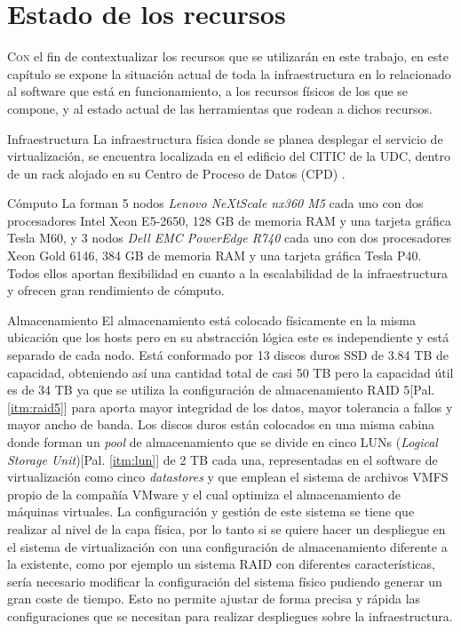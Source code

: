 \chapter{Estado de los recursos}
\label{chap:estadoInfraestructuraSistema}

\lettrine{C}{on} el fin de contextualizar los recursos que se utilizarán en este trabajo, en este capítulo se expone la situación actual de toda la infraestructura en lo relacionado al software que está en funcionamiento, a los recursos físicos de los que se compone, y al estado actual de las herramientas que rodean a dichos recursos.

\begin{section}{Infraestructura}
La infraestructura física donde se planea desplegar el servicio de virtualización, se encuentra localizada en el edificio del CITIC de la UDC, dentro de un rack alojado en su Centro de Proceso de Datos (CPD) \cite{citicUDC}. 
\begin{subsection}{Cómputo}
    La forman 5 nodos \textit{Lenovo NeXtScale nx360 M5} cada uno con dos procesadores Intel Xeon E5-2650, 128 GB de memoria RAM y una tarjeta gráfica Tesla M60,  y 3 nodos \textit{Dell EMC PowerEdge R740} cada uno con dos procesadores Xeon Gold 6146, 384 GB de memoria RAM y una tarjeta gráfica Tesla P40. Todos ellos aportan flexibilidad en cuanto a la escalabilidad de la infraestructura y ofrecen gran rendimiento de cómputo.
\end{subsection}
\begin{subsection}{Almacenamiento}
    El almacenamiento está colocado físicamente en la misma ubicación que los hosts pero en su abstracción lógica este es independiente y está separado de cada nodo. Está conformado por 13 discos duros SSD de 3.84 TB de capacidad, obteniendo así una cantidad total de casi 50 TB pero la capacidad útil es de 34 TB ya que se utiliza la configuración de almacenamiento RAID 5[Pal. \ref{itm:raid5}] para aporta mayor  integridad de los datos, mayor tolerancia a fallos y mayor ancho de banda. Los discos duros están colocados en una misma cabina donde forman un \textit{pool} de almacenamiento que se divide en cinco LUNs (\textit{Logical Storage Unit})[Pal. \ref{itm:lun}] de 2 TB cada una, representadas en el software de virtualización como cinco \textit{datastores} y que emplean el sistema de archivos VMFS propio de la compañía VMware y el cual optimiza el almacenamiento de máquinas virtuales.
    La configuración y gestión de este sistema se tiene que realizar al nivel de la capa física, por lo tanto si se quiere hacer un despliegue en el sistema de virtualización con una configuración de almacenamiento diferente a la existente, como por ejemplo un sistema RAID con diferentes características, sería necesario modificar la configuración del sistema físico pudiendo generar un gran coste de tiempo. Esto no permite ajustar de forma precisa y rápida las configuraciones que se necesitan para realizar despliegues sobre la infraestructura.
\end{subsection}


\end{section}
